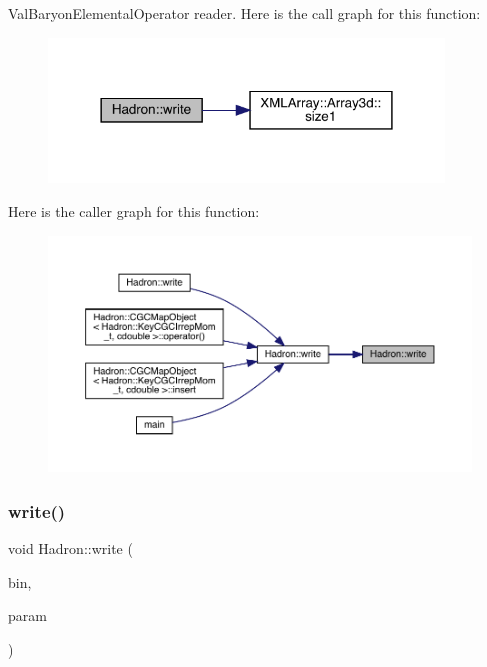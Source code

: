 Val\+Baryon\+Elemental\+Operator reader. Here is the call graph for this function\+:
\nopagebreak
\begin{figure}[H]
\begin{center}
\leavevmode
\includegraphics[width=298pt]{d1/daf/namespaceHadron_a6ba238c6945bb5d95ae189cfee93a690_cgraph}
\end{center}
\end{figure}
Here is the caller graph for this function\+:
\nopagebreak
\begin{figure}[H]
\begin{center}
\leavevmode
\includegraphics[width=350pt]{d1/daf/namespaceHadron_a6ba238c6945bb5d95ae189cfee93a690_icgraph}
\end{center}
\end{figure}
\mbox{\label{namespaceHadron_a78737ee2e9f7f708d926ec9f531c8f61}} 
\subsubsection{\texorpdfstring{write()}{write()}\hspace{0.1cm}{\footnotesize\ttfamily [70/95]}}
{\footnotesize\ttfamily void Hadron\+::write (\begin{DoxyParamCaption}\item[{\mbox{\hyperlink{classADATIO_1_1BinaryWriter}{Binary\+Writer}} \&}]{bin,  }\item[{const \mbox{\hyperlink{structHadron_1_1ValUnsmearedMesonElementalOperator__t}{Val\+Unsmeared\+Meson\+Elemental\+Operator\+\_\+t}} \&}]{param }\end{DoxyParamCaption})}



